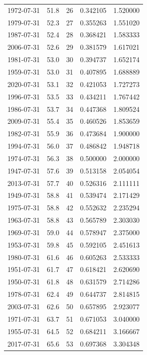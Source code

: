 \documentclass[
  letterpaper,
  DIV=11,
  numbers=noendperiod]{scrreprt}
\begin{document}
\begin{tabular}{lrrrr}
1972-07-31 &   51.8 &  26 &  0.342105 &   1.520000 \\
1979-07-31 &   52.3 &  27 &  0.355263 &   1.551020 \\
1987-07-31 &   52.4 &  28 &  0.368421 &   1.583333 \\
2006-07-31 &   52.6 &  29 &  0.381579 &   1.617021 \\
1981-07-31 &   53.0 &  30 &  0.394737 &   1.652174 \\
1959-07-31 &   53.0 &  31 &  0.407895 &   1.688889 \\
2020-07-31 &   53.1 &  32 &  0.421053 &   1.727273 \\
1996-07-31 &   53.5 &  33 &  0.434211 &   1.767442 \\
1986-07-31 &   53.7 &  34 &  0.447368 &   1.809524 \\
2009-07-31 &   55.4 &  35 &  0.460526 &   1.853659 \\
1982-07-31 &   55.9 &  36 &  0.473684 &   1.900000 \\
1994-07-31 &   56.0 &  37 &  0.486842 &   1.948718 \\
1974-07-31 &   56.3 &  38 &  0.500000 &   2.000000 \\
1947-07-31 &   57.6 &  39 &  0.513158 &   2.054054 \\
2013-07-31 &   57.7 &  40 &  0.526316 &   2.111111 \\
1949-07-31 &   58.8 &  41 &  0.539474 &   2.171429 \\
1975-07-31 &   58.8 &  42 &  0.552632 &   2.235294 \\
1963-07-31 &   58.8 &  43 &  0.565789 &   2.303030 \\
1969-07-31 &   59.0 &  44 &  0.578947 &   2.375000 \\
1953-07-31 &   59.8 &  45 &  0.592105 &   2.451613 \\
1980-07-31 &   61.6 &  46 &  0.605263 &   2.533333 \\
1951-07-31 &   61.7 &  47 &  0.618421 &   2.620690 \\
1950-07-31 &   61.8 &  48 &  0.631579 &   2.714286 \\
1978-07-31 &   62.4 &  49 &  0.644737 &   2.814815 \\
2003-07-31 &   62.6 &  50 &  0.657895 &   2.923077 \\
1971-07-31 &   63.7 &  51 &  0.671053 &   3.040000 \\
1955-07-31 &   64.5 &  52 &  0.684211 &   3.166667 \\
2017-07-31 &   65.6 &  53 &  0.697368 &   3.304348 \\

\end{tabular}
\end{document}

